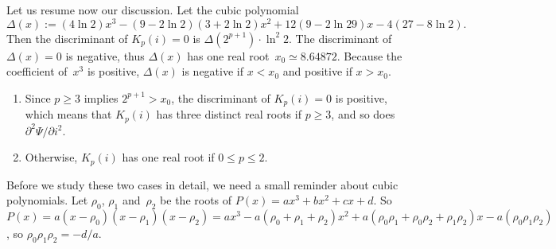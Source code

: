 Let us resume now our discussion. Let the cubic polynomial
\begin{equation*}
\Delta(x) \!:= (4\ln 2)x^3 - (9 - 2\ln 2)(3 + 2\ln 2)x^2 + 12(9 - 2\ln
29)x - 4(27 - 8\ln 2).
\end{equation*}
Then the discriminant of \(K_p(i) = 0\) is \(\Delta(2^{p+1}) \cdot
\ln^2 2\). The discriminant of \(\Delta(x) = 0 \) is negative, thus
\(\Delta(x)\) has one real root~\(x_0 \simeq 8.64872\). Because the
coefficient of~\(x^3\) is positive, \(\Delta(x)\) is negative if \(x <
x_0\) and positive if \(x > x_0\).
\begin{enumerate}

  \item Since \(p \geqslant 3\) implies \(2^{p+1} > x_0\), the
    discriminant of \(K_p(i) = 0\) is positive,
    which means that \(K_p(i)\) has three distinct real roots if \(p
    \geqslant 3\), and so does \(\partial^2\Psi/\partial
    i^2\).

  \item Otherwise, \(K_p(i)\) has one real root if \(0 \leqslant p
    \leqslant 2\).

\end{enumerate}
Before we study these two cases in detail, we need a small reminder
about cubic polynomials. Let \(\rho_0\), \(\rho_1\) and~\(\rho_2\) be
the roots of \(P(x) = ax^3 + bx^2 + cx + d\). So \(P(x) =
a(x-\rho_0)(x-\rho_1)(x-\rho_2) = ax^3 - a(\rho_0+\rho_1+\rho_2)x^2 +
a(\rho_0\rho_1 + \rho_0\rho_2 + \rho_1 \rho_2)x -
a(\rho_0\rho_1\rho_2)\), so \(\rho_0\rho_1\rho_2 = -d/a\).
